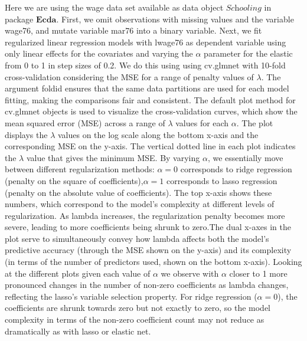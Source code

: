 \documentclass[
]{article}
\begin{document}
Here we are using the wage data set available as data object
\(\textit{Schooling}\) in package \(\textbf{Ecda}\). First, we omit
observations with missing values and the variable wage76, and mutate
variable mar76 into a binary variable. Next, we fit regularized linear
regression models with lwage76 as dependent variable using only linear
effects for the covariates and varying the \(\alpha\) parameter for the
elastic from 0 to 1 in step sizes of 0.2. We do this using using
cv.glmnet with 10-fold cross-validation considering the MSE for a range
of penalty values of \(\lambda\). The argument foldid ensures that the
same data partitions are used for each model fitting, making the
comparisons fair and consistent. The default plot method for cv.glmnet
objects is used to visualize the cross-validation curves, which show the
mean squared error (MSE) across a range of \(\lambda\) values for each
\(\alpha\). The plot displays the \(\lambda\) values on the log scale
along the bottom x-axis and the corresponding MSE on the y-axis. The
vertical dotted line in each plot indicates the \(\lambda\) value that
gives the minimum MSE. By varying \(\alpha\), we essentially move
between different regularization methods: \(\alpha = 0\) corresponds to
ridge regression (penalty on the square of coefficients),\(\alpha = 1\)
corresponds to lasso regression (penalty on the absolute value of
coefficients). The top x-axis shows these numbers, which correspond to
the model's complexity at different levels of regularization. As lambda
increases, the regularization penalty becomes more severe, leading to
more coefficients being shrunk to zero.The dual x-axes in the plot serve
to simultaneously convey how lambda affects both the model's predictive
accuracy (through the MSE shown on the y-axis) and its complexity (in
terms of the number of predictors used, shown on the bottom x-axis).
Looking at the different plots given each value of \(\alpha\) we observe
with \(\alpha\) closer to 1 more pronounced changes in the number of
non-zero coefficients as lambda changes, reflecting the lasso's variable
selection property. For ridge regression (\(\alpha = 0\)), the
coefficients are shrunk towards zero but not exactly to zero, so the
model complexity in terms of the non-zero coefficient count may not
reduce as dramatically as with lasso or elastic net.
\end{document}
